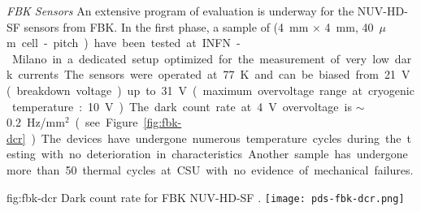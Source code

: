 


\textit{FBK Sensors} 
An extensive program of evaluation is underway for the NUV-HD-SF sensors from FBK. In the first phase, a sample of (\SI{4}{mm} $\times$ \SI{4}{mm}, \SI{40}{$\mu$m} cell-pitch) have been tested at INFN-Milano in a dedicated setup optimized for the measurement of very low dark currents. The sensors were operated at \SI{77}{K} and can be biased from \SI{21}{V} (breakdown voltage) up to \SI{31}{V} (maximum overvoltage range at cryogenic temperature: \SI{+10}{V}). The dark count rate at \SI{+4}{V} overvoltage is $\sim$\SI{0.2}{Hz/mm$^2$} (see Figure~\ref{fig:fbk-dcr}). 

The devices have undergone numerous temperature cycles during the testing with no deterioration in characteristics. Another sample has undergone more than 50 thermal cycles at CSU with no evidence of mechanical failures.  %

\begin{dunefigure}
 {fig:fbk-dcr}
 {Dark count rate for FBK NUV-HD-SF .}
\texttt{[image: pds-fbk-dcr.png]}
\end{dunefigure}



